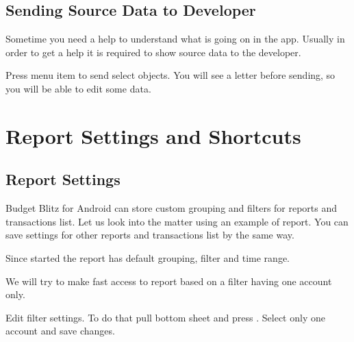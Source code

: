 \documentclass[a4paper,10pt,english]{sphinxmanual}
\begin{document}
\section{Sending Source Data to Developer}
\label{\detokenize{bulk-actions:sending-source-data-to-developer}}
Sometime you need a help to understand what is going on in the app. Usually in
order to get a help it is required to show source data to the developer.

Press  menu item to send select objects. You will
see a letter before sending, so you will be able to edit some data.

\noindent{}

\noindent{}


\chapter{Report Settings and Shortcuts}
\label{\detokenize{shortcuts:report-settings-and-shortcuts}}\label{\detokenize{shortcuts:chapter-shortcuts}}\label{\detokenize{shortcuts::doc}}

\section{Report Settings}
\label{\detokenize{shortcuts:report-settings}}
Budget Blitz for Android can store custom grouping and filters for reports and transactions list. Let us
look into the matter using an example of  report. You can save
settings for other reports and transactions list by the same way.

Since started the report has default grouping, filter and time range.

\noindent{}

\noindent{}

\noindent{}

We will try to make fast access to  report based on a filter having one account only.

Edit filter settings. To do that pull bottom sheet and press . Select only one account
and save changes.
\end{document}
